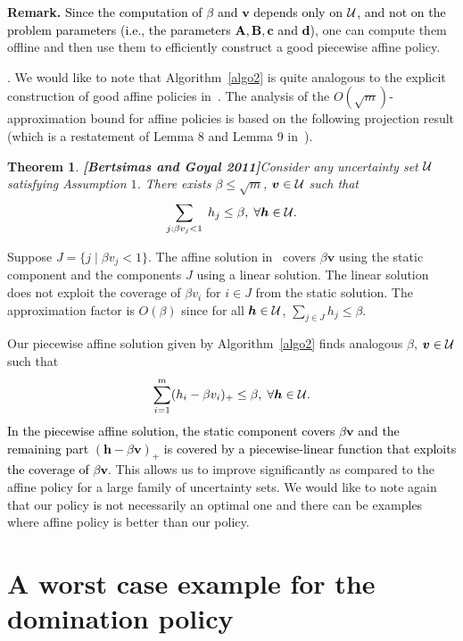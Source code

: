 \documentclass[11pt]{article}
\theoremstyle{plain}
\newtheorem{theorem}{Theorem}[section]
\theoremstyle{definition}
\numberwithin{equation}{section}%
\numberwithin{equation}{section}%
\newcommand{\mb}[1]{\ensuremath{\boldsymbol{#1}}}
\newcommand*{\red}{\textcolor{black}}
\begin{document}
\textbf{Remark.}
\red{Since the computation of $\beta$ and $\mb v$ depends only on ${\cal U}$, and not on the problem parameters (i.e., the parameters $\mb A, \mb B, \mb c$ and $\mb d$)}, one can compute them offline and then use them to efficiently construct a good piecewise affine policy.


\vspace{3mm}
. We would like to note that Algorithm~\ref{algo2} is quite analogous to the explicit construction of good affine policies in~\cite{BG10}. The analysis of the $O(\sqrt m)$-approximation bound for affine policies is based on the following projection result (which is a restatement of Lemma 8 and Lemma 9  in~\cite{BG10}).

\begin{theorem}{\bf[Bertsimas and Goyal 2011]}\label{thm:berti-goyal}
Consider any uncertainty set ${\cal U}$ satisfying Assumption $1$. There exists  $\beta \leq \sqrt m$, $\mb v \in {\cal U}$ such that
\[ \sum_{ j : \beta v_j < 1} \; h_j \leq \beta, \; \forall \mb h \in {\cal U}.\]
\end{theorem}
Suppose $J = \{ j \; |\; \beta v_j < 1\}$. The affine solution in~\cite{BG10} covers $\beta \mb{v}$ using the static component and the components $J$ using a linear solution.  The linear solution does not exploit the coverage of $\beta v_i$ for $ i \in J$ from the static solution. The approximation factor is $O(\beta)$ since for all $\mb h \in {\cal U}$,  $\sum_{j \in J} h_j \leq \beta$.

Our piecewise affine solution given by Algorithm~\ref{algo2} finds analogous $ \beta$, $\mb v \in {\cal U}$ such that
\[ \sum_{i=1}^m ( h_i  - \beta v_i) _+ \leq \beta, \; \forall \mb h \in {\cal U}.\]
\red{In the piecewise affine solution, the static component covers  $\beta \mb v$ and the remaining part $( \mb h  -  \beta \mb v)_+$ is covered by a piecewise-linear function that exploits the coverage of $\beta \mb v$}. This allows us to improve significantly as compared to the affine policy for a large family of uncertainty sets. We would like to note again that our policy is not necessarily an optimal one and there can be examples where affine policy is better than our policy.


\section{A worst case example for the domination policy}\label{sec:worst-case}
\end{document}
